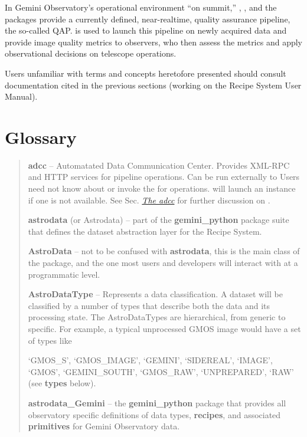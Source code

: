 \documentclass[letterpaper,10pt,english]{sphinxmanual}
\begin{document}
In Gemini Observatory's operational environment ``on summit,'' ,
, and the  packages provide a currently defined,
near-realtime, quality assurance pipeline, the so-called QAP.  is used
to launch this pipeline on newly acquired data and provide image quality metrics
to observers, who then assess the metrics and apply observational decisions on
telescope operations.

Users unfamiliar with terms and concepts heretofore presented should consult
documentation cited in the previous sections (working on the Recipe System User
Manual).


\section{Glossary}
\label{intro:glossary}\begin{quote}

\textbf{adcc} -- Automatated Data Communication Center. Provides XML-RPC and HTTP
services for pipeline operations. Can be run externally to  Users
need not know about or invoke the  for  operations.
 will launch an  instance if one is not available. See
Sec. {\hyperref[discuss:adcc]{\emph{The adcc}}} for further discussion on .

\textbf{astrodata} (or Astrodata) -- part of the \textbf{gemini\_python} package suite
that defines the dataset abstraction layer for the Recipe System.

\textbf{AstroData} -- not to be confused with \textbf{astrodata}, this is the main class
of the  package, and the one most users and developers will
interact with at a programmatic level.

\textbf{AstroDataType} -- Represents a data classification. A dataset will be
classified by a number of types that describe both the data and its processing
state. The AstroDataTypes are hierarchical, from generic to specific.  For
example, a typical unprocessed GMOS image would have a set of types like

`GMOS\_S', `GMOS\_IMAGE', `GEMINI', `SIDEREAL', `IMAGE', `GMOS', `GEMINI\_SOUTH',
`GMOS\_RAW', `UNPREPARED', `RAW' (see \textbf{types} below).

\textbf{astrodata\_Gemini} -- the \textbf{gemini\_python} package that provides all
observatory specific definitions of data types, \textbf{recipes}, and associated
\textbf{primitives} for Gemini Observatory data.


\end{quote}
\end{document}
